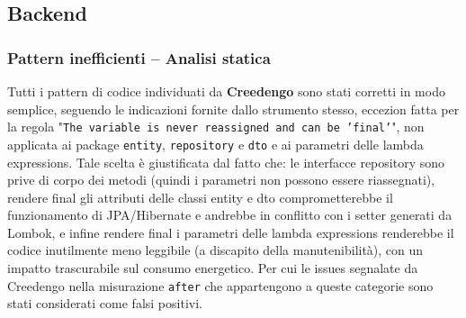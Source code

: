 \documentclass[12pt,a4paper]{article}
\begin{document}
    \subsection{Backend}

    \subsubsection{Pattern inefficienti -- Analisi statica}
    Tutti i pattern di codice individuati da \textbf{Creedengo} sono stati corretti in modo semplice,
    seguendo le indicazioni fornite dallo strumento stesso, eccezion fatta per la regola
    "\texttt{The variable is never reassigned and can be 'final'}", non applicata ai package
    \texttt{entity}, \texttt{repository} e \texttt{dto} e ai parametri delle lambda
    expressions. Tale scelta è giustificata dal fatto che: le interfacce repository sono
    prive di corpo dei metodi (quindi i parametri non possono essere riassegnati), rendere
    final gli attributi delle classi entity e dto comprometterebbe il funzionamento di
    JPA/Hibernate e andrebbe in conflitto con i setter generati da Lombok, e infine rendere final i
    parametri delle lambda expressions renderebbe il codice inutilmente meno leggibile (a
    discapito della manutenibilità), con un impatto trascurabile sul consumo energetico.
    Per cui le issues segnalate da Creedengo nella misurazione \texttt{after} che appartengono a
    queste categorie sono stati considerati come falsi positivi.
\end{document}
